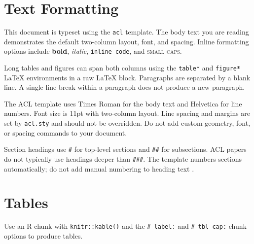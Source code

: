 \documentclass[11pt]{article}
\begin{document}
\section{Text Formatting}\label{text-formatting}

This document is typeset using the \texttt{acl} template. The body text
you are reading demonstrates the default two-column layout, font, and
spacing. Inline formatting options include \textbf{bold}, \emph{italic},
\texttt{inline\ code}, and \textsc{small caps}.

Long tables and figures can span both columns using the \texttt{table*}
and \texttt{figure*} LaTeX environments in a raw LaTeX block. Paragraphs
are separated by a blank line. A single line break within a paragraph
does not produce a new paragraph.

The ACL template uses Times Roman for the body text and Helvetica for
line numbers. Font size is 11pt with two-column layout. Line spacing and
margins are set by \texttt{acl.sty} and should not be overridden. Do not
add custom geometry, font, or spacing commands to your document.

Section headings use \texttt{\#} for top-level sections and
\texttt{\#\#} for subsections. ACL papers do not typically use headings
deeper than \texttt{\#\#\#}. The template numbers sections
automatically; do not add manual numbering to heading text
\citep{Smith2020}.

\section{Tables}\label{tables}

Use an R chunk with \texttt{knitr::kable()} and the
\texttt{\#\textbar{}\ label:} and \texttt{\#\textbar{}\ tbl-cap:} chunk
options to produce tables.

\begin{table}


\caption{\label{tbl-example}A simple table showing condition means.}

\end{table}%
\end{document}
